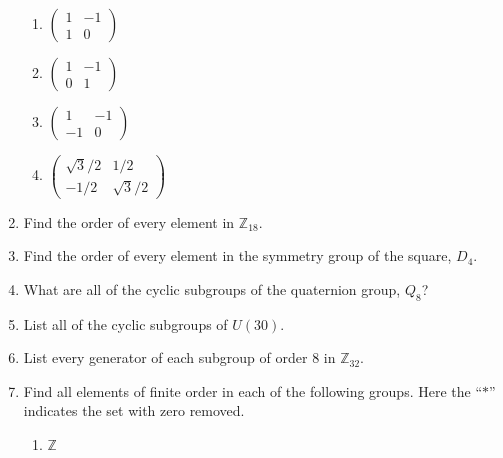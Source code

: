 \documentclass[12pt,reqno]{amsart}
\begin{document}
\begin{enumerate}[{\bf 1.}]
\begin{multicols}{3}
\begin{enumerate}
\item
$\displaystyle
\begin{pmatrix}
1 & -1 \\
1 & 0
\end{pmatrix}
$

\item
$\displaystyle
\begin{pmatrix}
1 & -1 \\
0 & 1
\end{pmatrix}
$

\item
$\displaystyle
\begin{pmatrix}
1 & -1 \\
-1 & 0
\end{pmatrix}
$
 
\item
$\displaystyle
\begin{pmatrix}
\sqrt{3}/ 2 & 1/2 \\
-1/2 & \sqrt{3}/2
\end{pmatrix}
$

 \end{enumerate}
\end{multicols}

 

\item		  %
Find the order of every element in ${\mathbb Z}_{18}$.
 
 
\item
Find the order of every element in the symmetry group of the square,
$D_4$.
 
 
\item
What are all of the cyclic subgroups of the quaternion group, $Q_8$? 
 
 
\item
List all of the cyclic subgroups of $U(30)$.
 
 
\item
List every generator of each subgroup of order 8 in ${\mathbb
Z}_{32}$.
 
\item
Find all elements of finite order in each of the following groups. Here the ``$\ast$'' indicates the set with zero removed.
\begin{multicols}{3}
\begin{enumerate}
 
 \item
${\mathbb Z}$
 

\end{enumerate}
\end{multicols}
\end{enumerate}
\end{document}
